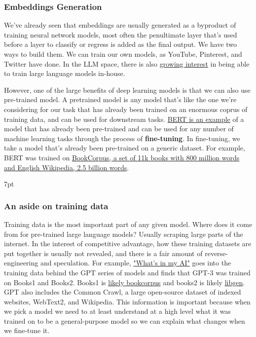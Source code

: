 \documentclass[11pt, table]{diazessay} %
\newenvironment{formal}{%
  \def\FrameCommand{%
	\hspace{1pt}%
	{\color{w_lightblue}\vrule width 2pt}%
	{\color{formalshade}\vrule width 4pt}%
	\colorbox{formalshade}%
  }%
  \MakeFramed{\advance\hsize-\width\FrameRestore}%
  \noindent\hspace{-4.55pt}%
  \begin{adjustwidth}{}{7pt}%
  \vspace{2pt}\vspace{2pt}%
}
{%
  \vspace{2pt}\end{adjustwidth}\endMakeFramed%
}
\begin{document}
\begin{sloppypar}
\subsubsection{Embeddings Generation}

We've already seen that embeddings are usually generated as a byproduct of training neural network models, most often the penultimate layer that's used before a layer to classify or regress is added as the final output. We have two ways to build them. We can train our own models, as YouTube, Pinterest, and Twitter have done. In the LLM space, there is also \href{https://blog.replit.com/llm-training}{growing interest} in being able to train large language models in-house.

However, one of the large benefits of deep learning models is that we can also use pre-trained model. A pretrained model is any model that's like the one we're considering for our task that has already been trained on an enormous coprus of training data, and can be used for downstream tasks. \href{https://huggingface.co/docs/transformers/model_doc/bert}{BERT is an example} of a model that has already been pre-trained and can be used for any number of machine learning tasks through the process of \textbf{fine-tuning}. In fine-tuning, we take a model that's already been pre-trained on a generic dataset. For example, BERT was trained on \href{https://resources.wolframcloud.com/NeuralNetRepository/resources/BERT-Trained-on-BookCorpus-and-English-Wikipedia-Data}{BookCorpus, a set of 11k books with 800 million words and English Wikipedia, 2.5 billion words}.


\begin{formal}
\subsubsection*{An aside on training data}
Training data is the most important part of any given model. Where does it come from for pre-trained large language models? Usually scraping large parts of the internet. In the interest of competitive advantage, how these training datasets are put together is usually not revealed, and there is a fair amount of reverse-engineering and speculation. For example, \href{https://s10251.pcdn.co/pdf/2022-Alan-D-Thompson-Whats-in-my-AI-Rev-0.pdf}{"What's in my AI"} goes into the training data behind the GPT series of models and finds that GPT-3 was trained on Books1 and Books2. Books1 is \href{https://github.com/soskek/bookcorpus/issues/27#issuecomment-716104208}{likely bookcorpus} and books2 is likely \href{https://en.wikipedia.org/wiki/Library_Genesis}{libgen}. GPT also includes the Common Crawl, a large open-source dataset of indexed websites, WebText2, and Wikipedia. This information is important because when we pick  a model we need to at least understand at a high level what it was trained on to be a general-purpose model so we can explain what changes when we fine-tune it.
\end{formal}


\end{sloppypar}
\end{document}

